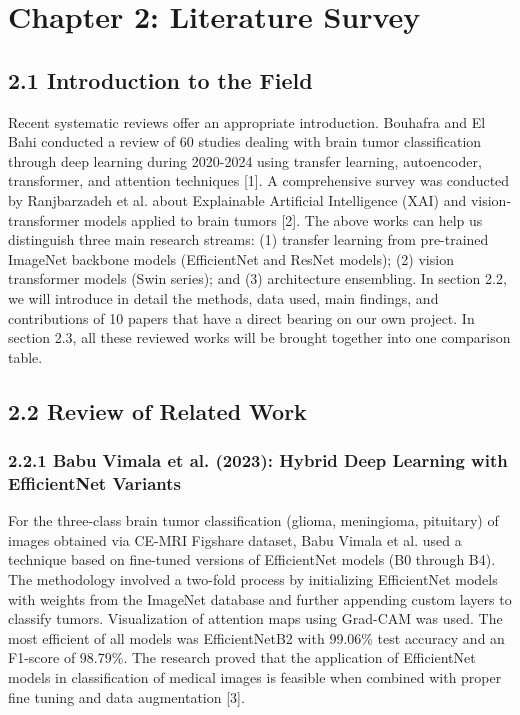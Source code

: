 \documentclass[12pt,a4paper,oneside]{report}
\begin{document}
\chapter{Chapter 2: Literature Survey}
\section{2.1 Introduction to the Field}
Recent systematic reviews offer an appropriate introduction. Bouhafra and El Bahi conducted a review of 60 studies dealing with brain tumor classification through deep learning during 2020-2024 using transfer learning, autoencoder, transformer, and attention techniques [1]. A comprehensive survey was conducted by Ranjbarzadeh et al. about Explainable Artificial Intelligence (XAI) and vision-transformer models applied to brain tumors [2]. The above works can help us distinguish three main research streams: (1) transfer learning from pre-trained ImageNet backbone models (EfficientNet and ResNet models); (2) vision transformer models (Swin series); and (3) architecture ensembling.
In section 2.2, we will introduce in detail the methods, data used, main findings, and contributions of 10 papers that have a direct bearing on our own project. In section 2.3, all these reviewed works will be brought together into one comparison table.
\section{2.2 Review of Related Work}
\subsection{2.2.1 Babu Vimala et al. (2023): Hybrid Deep Learning with EfficientNet Variants}
For the three-class brain tumor classification (glioma, meningioma, pituitary) of images obtained via CE-MRI Figshare dataset, Babu Vimala et al. used a technique based on fine-tuned versions of EfficientNet models (B0 through B4). The methodology involved a two-fold process by initializing EfficientNet models with weights from the ImageNet database and further appending custom layers to classify tumors. Visualization of attention maps using Grad-CAM was used. The most efficient of all models was EfficientNetB2 with 99.06\% test accuracy and an F1-score of 98.79\%. The research proved that the application of EfficientNet models in classification of medical images is feasible when combined with proper fine tuning and data augmentation [3].
\end{document}
